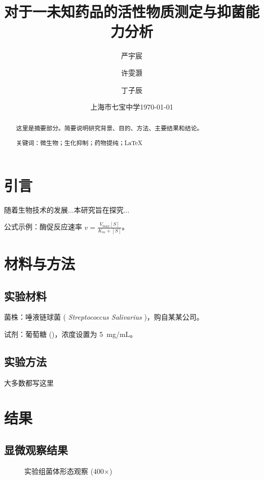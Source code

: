 \documentclass[a4paper,12pt]{ctexart} %
\newcommand{\mytitle}{对于一未知药品的活性物质测定与抑菌能力分析} %
\newcommand{\myname}{严宇宸 \and 许雯灏 \and 丁子辰} %
\newcommand{\myschool}{上海市七宝中学} %
\begin{document}
\title{\mytitle}
\author{\myname}
\date{\myschool \quad \today}
\maketitle

\begin{abstract}
    这里是摘要部分。简要说明研究背景、目的、方法、主要结果和结论。

    关键词：微生物；生化抑制；药物提纯；\LaTeX
\end{abstract}

\section{引言}
随着生物技术的发展...本研究旨在探究...

公式示例：酶促反应速率 $v = \frac{V_{max}[S]}{K_m + [S]}$。

\section{材料与方法}
\subsection{实验材料}
菌株：唾液链球菌 ( \textit{Streptococcus Salivarius} )\cite{labgrowth}，购自某某公司。

试剂：葡萄糖 ()，浓度设置为 \SI{5}{mg/mL}。

\subsection{实验方法}
大多数都写这里

\section{结果}
\subsection{显微观察结果}
\begin{figure}[H]
    \centering
    \caption{实验组菌体形态观察 (400×)}
    \label{fig:micro}
\end{figure}
\end{document}
